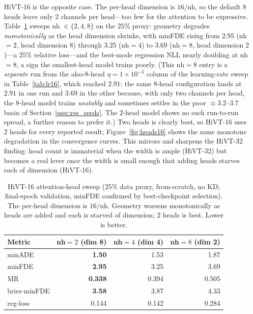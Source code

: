 HiVT-16 is the opposite case. The per-head dimension is $16/\mathrm{nh}$, so the
default $8$ heads leave only $2$ channels per head---too few for the attention to
be expressive. Table~\ref{tab:heads16} sweeps nh $\in\{2,4,8\}$ on the $25\%$
proxy: geometry degrades \emph{monotonically} as the head dimension shrinks, with
minFDE rising from $2.95$ (nh$=2$, head dimension $8$) through $3.25$ (nh$=4$) to
$3.69$ (nh$=8$, head dimension $2$)---a $25\%$ relative loss---and the best-mode
regression NLL nearly doubling at nh$=8$, a sign the smallest-head model trains
poorly. (This nh$=8$ entry is a \emph{separate} run from the also-$8$-head
$\eta=1\times10^{-3}$ column of the learning-rate sweep in Table~\ref{tab:lr16},
which reached $2.91$: the same $8$-head configuration lands at $2.91$ in one run and
$3.69$ in the other because, with only two channels per head, the $8$-head model
trains \emph{unstably} and sometimes settles in the poor ${\approx}3.2$--$3.7$ basin
of Section~\ref{ssec:res_seeds}. The $2$-head model shows no such run-to-run spread,
a further reason to prefer it.) Two heads is clearly best, so HiVT-16 uses $2$ heads
for every reported result; Figure~\ref{fig:heads16} shows the same monotone degradation in the
convergence curves. This mirrors and sharpens the HiVT-32 finding: head count is immaterial
when the width is ample (HiVT-32) but becomes a real lever once the width is small
enough that adding heads starves each of dimension (HiVT-16).

\begin{table}[htbp]
  \centering
  \caption{HiVT-16 attention-head sweep ($25\%$ data proxy, from-scratch, no KD;
    final-epoch validation, minFDE confirmed by best-checkpoint selection). The
    per-head dimension is $16/\mathrm{nh}$. Geometry worsens monotonically as heads
    are added and each is starved of dimension; $2$ heads is best. Lower is better.}
  \label{tab:heads16}
  \begin{tabular}{lrrr}
    \toprule
    Metric & nh${=}2$ (dim 8) & nh${=}4$ (dim 4) & nh${=}8$ (dim 2) \\
    \midrule
    minADE        & \textbf{1.50} & 1.53 & 1.87 \\
    minFDE        & \textbf{2.95} & 3.25 & 3.69 \\
    MR            & \textbf{0.338} & 0.394 & 0.505 \\
    brier-minFDE  & \textbf{3.58} & 3.87 & 4.33 \\
    reg-loss      & 0.144 & 0.142 & 0.284 \\
    \bottomrule
  \end{tabular}
\end{table}

